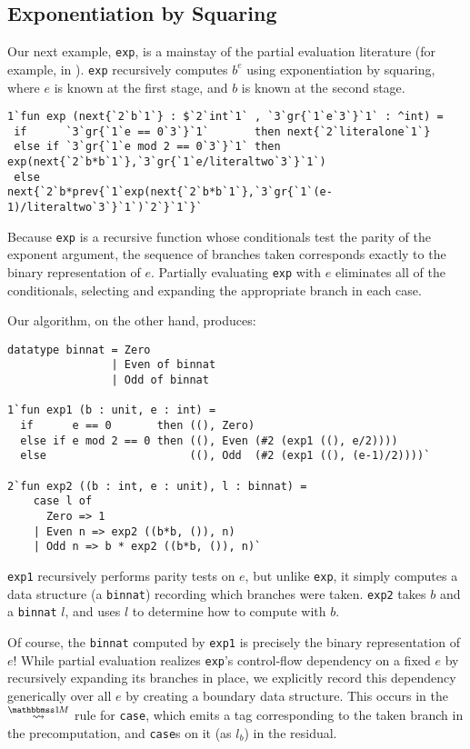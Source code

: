 \subsection{Exponentiation by Squaring}

Our next example, \texttt{exp}, is a mainstay of the partial evaluation
literature (for example, in \cite{jones96}). \texttt{exp} recursively computes
$b^e$ using exponentiation by squaring, where $e$ is known at the first stage,
and $b$ is known at the second stage. 
%
\begin{lstlisting} 
1`fun exp (next{`2`b`1`} : $`2`int`1` , `3`gr{`1`e`3`}`1` : ^int) = 
 if      `3`gr{`1`e == 0`3`}`1`       then next{`2`literalone`1`}
 else if `3`gr{`1`e mod 2 == 0`3`}`1` then exp(next{`2`b*b`1`},`3`gr{`1`e/literaltwo`3`}`1`)
 else                     next{`2`b*prev{`1`exp(next{`2`b*b`1`},`3`gr{`1`(e-1)/literaltwo`3`}`1`)`2`}`1`}`
\end{lstlisting}
%
Because \texttt{exp} is a recursive function whose conditionals test the parity
of the exponent argument, the sequence of branches taken corresponds exactly to
the binary representation of $e$. Partially evaluating \texttt{exp} with $e$
eliminates all of the conditionals, selecting and expanding the appropriate
branch in each case.

Our algorithm, on the other hand, produces:
%
\begin{lstlisting} 
datatype binnat = Zero
                | Even of binnat 
                | Odd of binnat

1`fun exp1 (b : unit, e : int) =
  if      e == 0       then ((), Zero)
  else if e mod 2 == 0 then ((), Even (#2 (exp1 ((), e/2))))
  else                      ((), Odd  (#2 (exp1 ((), (e-1)/2))))`

2`fun exp2 ((b : int, e : unit), l : binnat) =
    case l of
      Zero => 1
    | Even n => exp2 ((b*b, ()), n)
    | Odd n => b * exp2 ((b*b, ()), n)`
\end{lstlisting}
%
\texttt{exp1} recursively performs parity tests on $e$, but unlike \texttt{exp},
it simply computes a data structure (a \texttt{binnat}) recording which branches
were taken. \texttt{exp2} takes $b$ and a \texttt{binnat} $l$, and uses $l$ to
determine how to compute with $b$.

Of course, the \texttt{binnat} computed by \texttt{exp1} is precisely the binary
representation of $e$! While partial evaluation realizes \texttt{exp}'s
control-flow dependency on a fixed $e$ by recursively expanding its branches in
place, we explicitly record this dependency generically over all $e$ by creating
a boundary data structure. This occurs in the $\splitonesym$ rule for
\texttt{case}, which emits a tag corresponding to the taken branch in the
precomputation, and \texttt{case}s on it (as $l_b$) in the residual.

